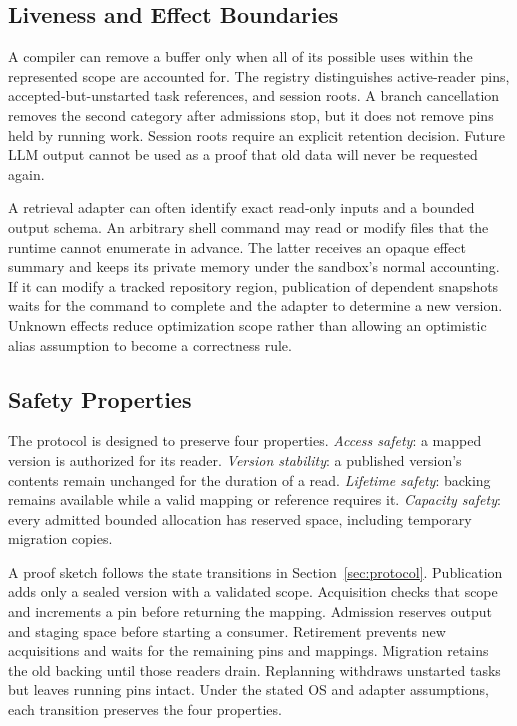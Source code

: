 \documentclass[letterpaper,twocolumn,10pt]{article}
\begin{document}
\subsection{Liveness and Effect Boundaries}

A compiler can remove a buffer only when all of its possible uses within the
represented scope are accounted for. The registry distinguishes active-reader
pins, accepted-but-unstarted task references, and session roots. A branch
cancellation removes the second category after admissions stop, but it does
not remove pins held by running work. Session roots require an explicit
retention decision. Future LLM output cannot be used as a proof that old data
will never be requested again.

A retrieval adapter can often identify exact read-only inputs and a bounded
output schema. An arbitrary shell command may read or modify files that the
runtime cannot enumerate in advance. The latter receives an opaque effect
summary and keeps its private memory under the sandbox's normal accounting.
If it can modify a tracked repository region, publication of dependent
snapshots waits for the command to complete and the adapter to determine a
new version. Unknown effects reduce optimization scope rather than allowing
an optimistic alias assumption to become a correctness rule.

\subsection{Safety Properties}
\label{sec:safety}

The protocol is designed to preserve four properties. \emph{Access safety}:
a mapped version is authorized for its reader. \emph{Version stability}: a
published version's contents remain unchanged for the duration of a read.
\emph{Lifetime safety}: backing remains available while a valid mapping or
reference requires it. \emph{Capacity safety}: every admitted bounded
allocation has reserved space, including temporary migration copies.

A proof sketch follows the state transitions in
Section~\ref{sec:protocol}. Publication adds only a sealed version with a
validated scope. Acquisition checks that scope and increments a pin before
returning the mapping. Admission reserves output and staging space before
starting a consumer. Retirement prevents new acquisitions and waits for the
remaining pins and mappings. Migration retains the old backing until those
readers drain. Replanning withdraws unstarted tasks but leaves running pins
intact. Under the stated OS and adapter assumptions, each transition
preserves the four properties.
\end{document}
